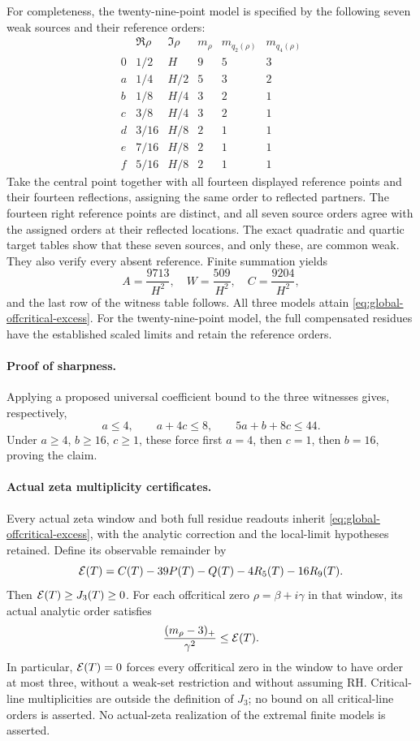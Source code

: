 For completeness, the twenty-nine-point model is specified by
the following seven weak sources and their reference orders:
\[
\begin{array}{c|c|c|r|rr}
 &\Re\rho&\Im\rho&m_\rho&m_{q_2(\rho)}&m_{q_4(\rho)}\\ \hline
 0&1/2&H&9&5&3\\
 a&1/4&H/2&5&3&2\\
 b&1/8&H/4&3&2&1\\
 c&3/8&H/4&3&2&1\\
 d&3/16&H/8&2&1&1\\
 e&7/16&H/8&2&1&1\\
 f&5/16&H/8&2&1&1
\end{array}
\]
Take the central point together with all fourteen displayed
reference points and their fourteen reflections, assigning the
same order to reflected partners. The fourteen right reference
points are distinct, and all seven source orders agree with
the assigned orders at their reflected locations. The exact
quadratic and quartic target tables show that these seven
sources, and only these, are common weak. They also verify every
absent reference. Finite summation yields
\[
 A=\frac{9713}{H^2},\quad W=\frac{509}{H^2},\quad
 C=\frac{9204}{H^2},
\]
and the last row of the witness table follows.
All three models attain \eqref{eq:global-offcritical-excess}.
For the twenty-nine-point model, the full compensated residues have
the established scaled limits and retain the reference orders.

\paragraph{Proof of sharpness.}
Applying a proposed universal coefficient bound to the three
witnesses gives, respectively,
\[
 a\le4,\qquad a+4c\le8,\qquad 5a+b+8c\le44.
\]
Under \(a\ge4\), \(b\ge16\), \(c\ge1\), these force first \(a=4\),
then \(c=1\), then \(b=16\), proving the claim.

\paragraph{Actual zeta multiplicity certificates.}
Every actual zeta window and both full residue readouts inherit
\eqref{eq:global-offcritical-excess}, with the analytic correction
and the local-limit hypotheses retained. Define its observable
remainder by
\[
 {\cal E}(T)=C(T)-39P(T)-Q(T)-4R_5(T)-16R_9(T).
\]
Then \({\cal E}(T)\ge J_3(T)\ge0\). For each offcritical zero
\(\rho=\beta+i\gamma\) in that window, its actual analytic order
satisfies
\[
 \frac{(m_\rho-3)_+}{\gamma^2}\le{\cal E}(T).
\]
In particular, \({\cal E}(T)=0\) forces every offcritical zero in
the window to have order at most three, without a weak-set
restriction and without assuming RH. Critical-line multiplicities
are outside the definition of \(J_3\); no bound on all
critical-line orders is asserted. No actual-zeta realization
of the extremal finite models is asserted.

